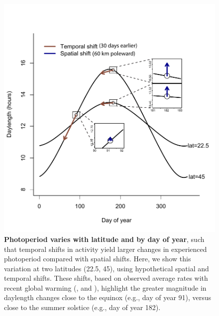 \documentclass{article}
\begin{document}
\begin{figure}[p]
\centering
\includegraphics{..//..//analyses/photoperiod/figures/photo_spacetime_v2.pdf} %
\caption{\textbf{Photoperiod varies with latitude and by day of year}, such that temporal shifts in activity yield larger changes in experienced photoperiod compared with spatial shifts. Here, we show this variation at two latitudes (22.5\degree, 45\degree), using hypothetical spatial and temporal shifts. These shifts, based on observed average rates with recent global warming (\citep[e.g.,16.9 kilometers per decade (or approximately 1.5 degrees in 100 years) for spatial shifts][]{parmesan2006}, and \citep[e.g.,.3 days per decade, or 23 days in 100 years, for temporal shifts][]{chen2011}), highlight the greater magnitude in daylength changes close to the equinox (e.g., day of year 91), versus close to the summer solstice (e.g., day of year 182).}
 \label{fig:spacetime}%
 \end{figure}
 
\end{document}
